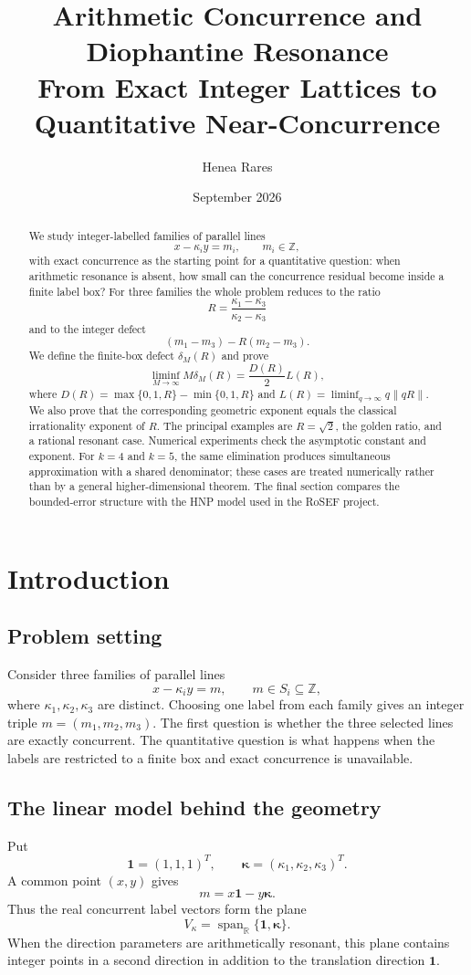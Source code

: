 \documentclass[12pt]{article}
\title{Arithmetic Concurrence and Diophantine Resonance\\
\large From Exact Integer Lattices to Quantitative Near-Concurrence}
\author{Henea Rares}
\date{September 2026}
\newcommand{\R}{\mathbb{R}}
\newcommand{\Z}{\mathbb{Z}}
\begin{document}
\maketitle
\thispagestyle{plain}

\begin{abstract}
We study integer-labelled families of parallel lines
\[
x-\kappa_i y=m_i,\qquad m_i\in\Z,
\]
with exact concurrence as the starting point for a quantitative question: when arithmetic resonance is absent, how small can the concurrence residual become inside a finite label box? For three families the whole problem reduces to the ratio
\[
R=\frac{\kappa_1-\kappa_3}{\kappa_2-\kappa_3}
\]
and to the integer defect
\[
(m_1-m_3)-R(m_2-m_3).
\]
We define the finite-box defect $\delta_M(R)$ and prove
\[
\liminf_{M\to\infty}M\delta_M(R)=\frac{D(R)}{2}L(R),
\]
where $D(R)=\max\{0,1,R\}-\min\{0,1,R\}$ and
$L(R)=\liminf_{q\to\infty}q\lVert qR\rVert$. We also prove that the corresponding geometric exponent equals the classical irrationality exponent of $R$.
The principal examples are $R=\sqrt2$, the golden ratio, and a rational resonant case. Numerical experiments check the asymptotic constant and exponent. For $k=4$ and $k=5$, the same elimination produces simultaneous approximation with a shared denominator; these cases are treated numerically rather than by a general higher-dimensional theorem. The final section compares the bounded-error structure with the HNP model used in the RoSEF project.
\end{abstract}

\clearpage
\tableofcontents
\thispagestyle{plain}
\clearpage

\section{Introduction}

\subsection{Problem setting}
Consider three families of parallel lines
\[
x-\kappa_i y=m,\qquad m\in S_i\subseteq\Z,
\]
where $\kappa_1,\kappa_2,\kappa_3$ are distinct. Choosing one label from each family gives an integer triple $m=(m_1,m_2,m_3)$. The first question is whether the three selected lines are exactly concurrent. The quantitative question is what happens when the labels are restricted to a finite box and exact concurrence is unavailable.

\subsection{The linear model behind the geometry}
Put
\[
\mathbf 1=(1,1,1)^T,
\qquad
\boldsymbol\kappa=(\kappa_1,\kappa_2,\kappa_3)^T.
\]
A common point $(x,y)$ gives
\begin{equation}\tag{E1}\label{E1}
 m=x\mathbf 1-y\boldsymbol\kappa.
\end{equation}
Thus the real concurrent label vectors form the plane
\[
V_\kappa=\operatorname{span}_{\R}\{\mathbf 1,\boldsymbol\kappa\}.
\]
When the direction parameters are arithmetically resonant, this plane contains integer points in a second direction in addition to the translation direction $\mathbf 1$.
\end{document}
